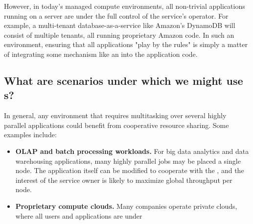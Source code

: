 However, in today's managed compute environments, all non-trivial applications running on a server are under the full control of the service's operator. For example, a multi-tenant database-as-a-service like Amazon's DynamoDB \cite{decandia2007dynamo} will consist of multiple tenants, all running proprietary Amazon code. In such an environment, ensuring that all applications "play by the rules" is simply a matter of integrating some mechanism like an \mech{} into the application code.

\subsection{What are scenarios under which we might use \mech{}s?}
In general, any environment that requires multitasking over several highly parallel applications could benefit from cooperative resource sharing. Some examples include:
\begin{itemize}
    \item \textbf{OLAP and batch processing workloads.} For big data analytics and data warehousing applications, many highly parallel jobs may be placed a single node. The application itself can be modified to cooperate with the \mech{}, and the interest of the service owner is likely to maximize global throughput per node.
    \item \textbf{Proprietary compute clouds.} Many companies operate private clouds, where all users and applications are under 
\end{itemize}
